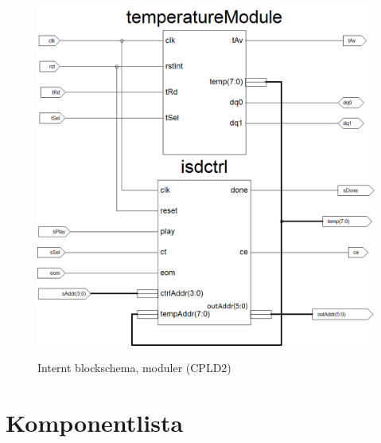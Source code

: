 \documentclass[a4paper,11pt]{article}
\begin{document}
		\begin{figure}[H]
		  \centering
		      \includegraphics[scale=0.40, angle=0]{Xilinx_CPLD2.png}
			\label{fig:BlockDiagram2}
		  	\caption{Internt blockschema, moduler (CPLD2)}
		\end{figure}	
	
	\section{Komponentlista}
	
\end{document}
